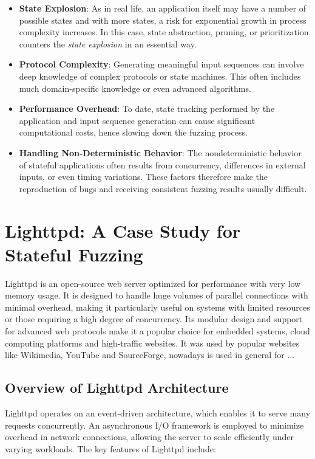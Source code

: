 \begin{itemize} 
    \item \textbf{State Explosion}: As in real life, an application itself may have a number of possible states and with more states, a risk for exponential growth in process complexity increases. In this case, state abstraction, pruning, or prioritization counters the \textit{state explosion} in an essential way.
    
    \item \textbf{Protocol Complexity}: Generating meaningful input sequences can involve deep knowledge of complex protocols or state machines. This often includes much domain-specific knowledge or even advanced algorithms.
    
    \item \textbf{Performance Overhead}: To date, state tracking performed by the application and input sequence generation can cause significant computational costs, hence slowing down the fuzzing process.

    \item \textbf{Handling Non-Deterministic Behavior}: The nondeterministic behavior of stateful applications often results from concurrency, differences in external inputs, or even timing variations. These factors therefore make the reproduction of bugs and receiving consistent fuzzing results usually difficult.

\end{itemize}

\section{Lighttpd: A Case Study for Stateful Fuzzing}
Lighttpd is an open-source web server optimized for performance with very low memory usage. It is designed to handle huge volumes of parallel connections with minimal overhead, making it particularly useful on systems with limited resources or those requiring a high degree of concurrency. Its modular design and support for advanced web protocols make it a popular choice for embedded systems, cloud computing platforms and high-traffic websites. It was used by popular websites like Wikimedia, YouTube and SourceForge, nowadays is used in general for ...%

\subsection{Overview of Lighttpd Architecture}
Lighttpd operates on an event-driven architecture, which enables it to serve many requests concurrently. An asynchronous I/O framework is employed to minimize overhead in network connections, allowing the server to scale efficiently under varying workloads. The key features of Lighttpd include:

